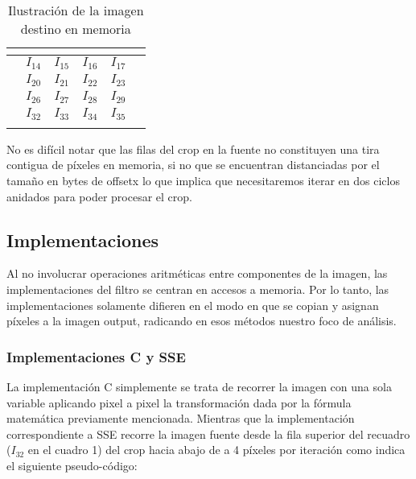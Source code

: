 \begin{table}[h]
\centering
\mem
\begin{tabular}{l|c|c|c|c|l}
& \multicolumn{1}{l|}{}       & \multicolumn{1}{l|}{}   & \multicolumn{1}{l|}{}     & \multicolumn{1}{l|}{}      &  \\ \hline
 & \cellcolor[HTML]{FD6864}$I_{14}$ & \cellcolor[HTML]{FD6864}$I_{15}$ & \cellcolor[HTML]{FD6864}$I_{16}$  & \cellcolor[HTML]{FD6864}$I_{17}$ &  \\ \hline
 & \cellcolor[HTML]{FD6864}$I_{20}$ & \cellcolor[HTML]{FD6864}$I_{21}$ & \cellcolor[HTML]{FD6864}$I_{22}$  & \cellcolor[HTML]{FD6864}$I_{23}$ &  \\ \hline
 & \cellcolor[HTML]{FD6864}$I_{26}$  & \cellcolor[HTML]{FD6864}$I_{27}$  & \cellcolor[HTML]{FD6864}$I_{28}$  & \cellcolor[HTML]{FD6864}$I_{29}$ &  \\ \hline
  & \cellcolor[HTML]{FD6864}$I_{32}$ & \cellcolor[HTML]{FD6864}$I_{33}$  & \cellcolor[HTML]{FD6864}$I_{34}$  & \cellcolor[HTML]{FD6864}$I_{35}$ &  \\ \hline
  & \multicolumn{1}{l|}{}       & \multicolumn{1}{l|}{}  & \multicolumn{1}{l|}{}      & \multicolumn{1}{l|}{}      &
\end{tabular}
\caption{Ilustración de la imagen destino en memoria}
\end{table}




No es difícil notar que las filas del crop en la fuente no constituyen una tira contigua de píxeles en memoria, si no que se encuentran distanciadas por el tamaño en bytes de offsetx lo que implica que necesitaremos iterar en dos ciclos anidados para poder procesar el crop.

\subsection{Implementaciones}
Al no involucrar operaciones aritméticas entre componentes de la imagen, las implementaciones del filtro se centran en accesos a memoria. Por lo tanto, las implementaciones solamente difieren en el modo en que se copian y asignan píxeles a la imagen output, radicando en esos métodos nuestro foco de análisis.
\subsubsection{Implementaciones C y SSE}
La implementación C simplemente se trata de recorrer la imagen con una sola variable aplicando pixel a pixel la transformación dada por la fórmula matemática previamente mencionada. Mientras que la implementación correspondiente a SSE recorre la imagen fuente desde la fila superior del recuadro ($I_{32}$ en el cuadro 1) del crop hacia abajo de a 4 píxeles por iteración como indica el siguiente pseudo-código:


